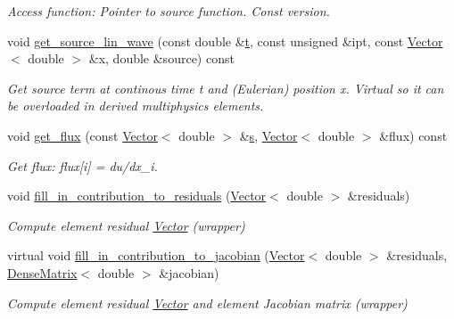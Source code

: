 \begin{DoxyCompactItemize}
\begin{DoxyCompactList}\small\item\em Access function\+: Pointer to source function. Const version. \end{DoxyCompactList}\item 
void \hyperlink{classoomph_1_1LinearWaveEquations_a1f2ef4ab9b1b50c29dc64ae4491265d1}{get\+\_\+source\+\_\+lin\+\_\+wave} (const double \&\hyperlink{cfortran_8h_af6f0bd3dc13317f895c91323c25c2b8f}{t}, const unsigned \&ipt, const \hyperlink{classoomph_1_1Vector}{Vector}$<$ double $>$ \&x, double \&source) const
\begin{DoxyCompactList}\small\item\em Get source term at continous time t and (Eulerian) position x. Virtual so it can be overloaded in derived multiphysics elements. \end{DoxyCompactList}\item 
void \hyperlink{classoomph_1_1LinearWaveEquations_a36ca5b4691a27beacd433a4f5279e1bf}{get\+\_\+flux} (const \hyperlink{classoomph_1_1Vector}{Vector}$<$ double $>$ \&\hyperlink{cfortran_8h_ab7123126e4885ef647dd9c6e3807a21c}{s}, \hyperlink{classoomph_1_1Vector}{Vector}$<$ double $>$ \&flux) const
\begin{DoxyCompactList}\small\item\em Get flux\+: flux\mbox{[}i\mbox{]} = du/dx\+\_\+i. \end{DoxyCompactList}\item 
void \hyperlink{classoomph_1_1LinearWaveEquations_a51319cb9bbb054c6a79d63b203d7d163}{fill\+\_\+in\+\_\+contribution\+\_\+to\+\_\+residuals} (\hyperlink{classoomph_1_1Vector}{Vector}$<$ double $>$ \&residuals)
\begin{DoxyCompactList}\small\item\em Compute element residual \hyperlink{classoomph_1_1Vector}{Vector} (wrapper) \end{DoxyCompactList}\item 
virtual void \hyperlink{classoomph_1_1LinearWaveEquations_a40f640d6f90bc3c4adb88d4aba3effce}{fill\+\_\+in\+\_\+contribution\+\_\+to\+\_\+jacobian} (\hyperlink{classoomph_1_1Vector}{Vector}$<$ double $>$ \&residuals, \hyperlink{classoomph_1_1DenseMatrix}{Dense\+Matrix}$<$ double $>$ \&jacobian)
\begin{DoxyCompactList}\small\item\em Compute element residual \hyperlink{classoomph_1_1Vector}{Vector} and element Jacobian matrix (wrapper) \end{DoxyCompactList}\item 

\end{DoxyCompactItemize}
